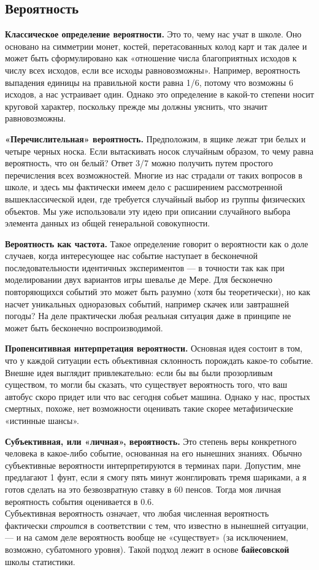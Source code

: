 \documentclass[11pt,a4paper]{article}
\begin{document}
\subsection{Вероятность}

\textbf{Классическое определение вероятности.} Это то, чему нас учат в
школе. Оно основано на симметрии монет, костей, перетасованных колод
карт и так далее и может быть сформулировано как «отношение числа
благоприятных исходов к числу всех исходов, если все исходы
равновозможны». Например, вероятность выпадения единицы на правильной
кости равна 1/6, потому что возможны 6 исходов, а нас устраивает один.
Однако это определение в какой-то степени носит круговой характер,
поскольку прежде мы должны уяснить, что значит равновозможны.

\textbf{«Перечислительная» вероятность.} Предположим, в ящике лежат три
белых и четыре черных носка. Если вытаскивать носок случайным образом,
то чему равна вероятность, что он белый? Ответ 3/7 можно получить путем
простого перечисления всех возможностей. Многие из нас страдали от таких
вопросов в школе, и здесь мы фактически имеем дело с расширением
рассмотренной вышеклассической идеи, где требуется случайный выбор из
группы физических объектов. Мы уже использовали эту идею при описании
случайного выбора элемента данных из общей генеральной совокупности.

\textbf{Вероятность как частота.} Такое определение говорит о
вероятности как о доле случаев, когда интересующее нас событие наступает
в бесконечной последовательности идентичных экспериментов --- в точности
так как при моделировании двух вариантов игры шевалье де Мере. Для
бесконечно повторяющихся событий это может быть разумно (хотя бы
теоретически), но как насчет уникальных одноразовых событий, например
скачек или завтрашней погоды? На деле практически любая реальная
ситуация даже в принципе не может быть бесконечно воспроизводимой.

\textbf{Пропенситивная интерпретация вероятности.} Основная идея состоит
в том, что у каждой ситуации есть объективная склонность порождать
какое-то событие. Внешне идея выглядит привлекательно: если бы вы были
прозорливым существом, то могли бы сказать, что существует вероятность
того, что ваш автобус скоро придет или что вас сегодня собьет машина.
Однако у нас, простых смертных, похоже, нет возможности оценивать такие
скорее метафизические «истинные шансы».

\textbf{Субъективная, или «личная», вероятность.} Это степень веры
конкретного человека в какое-либо событие, основанная на его нынешних
знаниях. Обычно субъективные вероятности интерпретируются в терминах
пари. Допустим, мне предлагают 1 фунт, если я смогу пять минут
жонглировать тремя шариками, а я готов сделать на это безвозвратную
ставку в 60 пенсов. Тогда моя личная вероятность события оценивается в
0.6.\\
Субъективная вероятность означает, что любая численная вероятность
фактически \emph{строится} в соответствии с тем, что известно в нынешней
ситуации, --- и на самом деле вероятность вообще не «существует» (за
исключением, возможно, субатомного уровня). Такой подход лежит в основе
\textbf{байесовской} школы статистики.
\end{document}
